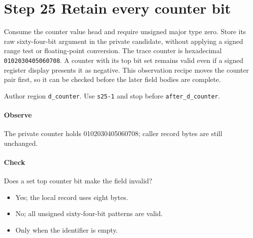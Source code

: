 \section{Step 25 Retain every counter bit}\label{cbor-s25}
Consume the counter value head and require unsigned major type zero. Store its raw sixty-four-bit argument in the private candidate, without applying a signed range test or floating-point conversion. The trace counter is hexadecimal \texttt{0102030405060708}. A counter with its top bit set remains valid even if a signed register display presents it as negative. This observation recipe moves the counter pair first, so it can be checked before the later field bodies are complete.

Author region \texttt{d\_counter}. Use \texttt{s25-1} and stop before \texttt{after\_d\_counter}.

\paragraph{Observe} The private counter holds 0102030405060708; caller record bytes are still unchanged.

\paragraph{Check} Does a set top counter bit make the field invalid?
\begin{itemize}
  \item[A.] Yes; the local record uses eight bytes.
  \item[B.] No; all unsigned sixty-four-bit patterns are valid.
  \item[C.] Only when the identifier is empty.
\end{itemize}
